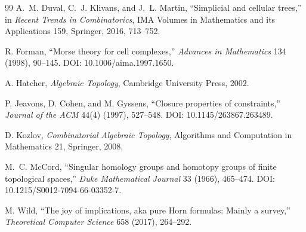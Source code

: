 \documentclass[11pt]{article}
\theoremstyle{definition}
\theoremstyle{remark}
\begin{document}
\begin{thebibliography}{99}
A.~M. Duval, C.~J. Klivans, and J.~L. Martin,
``Simplicial and cellular trees,'' in \emph{Recent Trends in Combinatorics},
IMA Volumes in Mathematics and its Applications 159, Springer, 2016, 713--752.

R. Forman,
``Morse theory for cell complexes,''
\emph{Advances in Mathematics} 134 (1998), 90--145.
DOI: 10.1006/aima.1997.1650.

A. Hatcher,
\emph{Algebraic Topology}, Cambridge University Press, 2002.

P. Jeavons, D. Cohen, and M. Gyssens,
``Closure properties of constraints,''
\emph{Journal of the ACM} 44(4) (1997), 527--548.
DOI: 10.1145/263867.263489.

D. Kozlov,
\emph{Combinatorial Algebraic Topology},
Algorithms and Computation in Mathematics 21, Springer, 2008.

M.~C. McCord,
``Singular homology groups and homotopy groups of finite topological spaces,''
\emph{Duke Mathematical Journal} 33 (1966), 465--474.
DOI: 10.1215/S0012-7094-66-03352-7.

M. Wild,
``The joy of implications, aka pure Horn formulas: Mainly a survey,''
\emph{Theoretical Computer Science} 658 (2017), 264--292.

\end{thebibliography}
\end{document}
